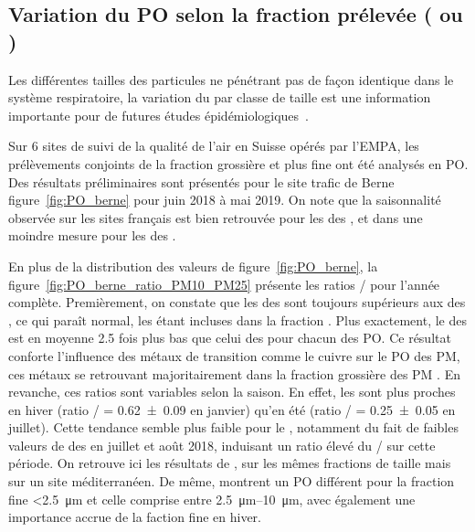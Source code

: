 \subsection{Variation du PO selon la fraction prélevée (\PMdix{} ou \PMdc)}%
\label{sub:pm10_pm2_5}

Les différentes tailles des particules ne pénétrant pas de façon identique dans le système
respiratoire, la variation du \POv{} par classe de taille est une information importante
pour de futures études épidémiologiques~\parencite{fangOxidative2019}.

Sur 6 sites de suivi de la qualité de l'air en Suisse opérés par l'EMPA, les prélèvements
conjoints de la fraction grossière \PMdix{} et plus fine \PMdc{} ont été analysés en PO.
Des résultats préliminaires sont présentés pour le site trafic de Berne
figure~\ref{fig:PO_berne} pour juin 2018 à mai 2019.  On note que la saisonnalité observée
sur les sites français est bien retrouvée pour les \POv{} des \PMdix, et dans une moindre
mesure pour les \POv{} des \PMdc.

En plus de la distribution des valeurs de \POv{} figure~\ref{fig:PO_berne}, la
figure~\ref{fig:PO_berne_ratio_PM10_PM25} présente les ratios \POv{} \PMdc/\PMdix{} pour
l'année complète. 
Premièrement, on constate que les \POv{} des \PMdix{} sont toujours supérieurs aux \POv{}
des \PMdc, ce qui paraît normal, les \PMdc{} étant incluses dans la fraction
\PMdix. Plus exactement, le \POv{} des \PMdc{} est en moyenne 2.5 fois plus bas que celui
des \PMdix{} pour chacun des PO. Ce résultat conforte l'influence des métaux de
transition comme le cuivre sur le PO des PM, ces métaux se retrouvant majoritairement
dans la fraction grossière des PM
.
En revanche, ces ratios sont variables selon la saison. En effet, les \POAAv{} sont
plus proches en hiver (ratio \PMdc/\PMdix{} = \num{0.62(9)} en janvier) qu'en été (ratio
\PMdc/\PMdix{} = \num{0.25(5)} en juillet). Cette tendance semble plus faible pour le
\PODTTv, notamment du fait de faibles valeurs de \PODTTv{} des \PMdix{} en juillet et août
2018, induisant un ratio élevé du \PODTTv{} \PMdc/\PMdix{} sur cette période.
On retrouve ici les résultats de \cite{perronePM22019}, sur les mêmes fractions de taille 
mais sur un site méditerranéen. De même, \cite{paraskevopoulouYearlong2019} montrent un PO 
différent pour la fraction fine \SI{<2.5}{\um} et celle comprise entre
\SIrange{2.5}{10}{\um}, avec également une importance accrue de la faction fine en hiver.

